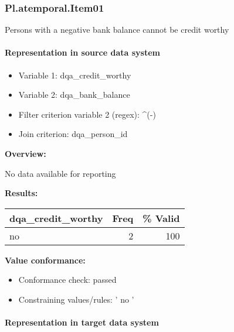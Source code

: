 \documentclass[
]{article}
\providecommand{\tightlist}{%
  \setlength{\itemsep}{0pt}\setlength{\parskip}{0pt}}
\begin{document}
\hypertarget{pl.atemporal.item01}{%
\subsubsection{Pl.atemporal.Item01}\label{pl.atemporal.item01}}

Persons with a negative bank balance cannot be credit worthy

\hypertarget{representation-in-source-data-system-12}{%
\paragraph{Representation in source data
system}\label{representation-in-source-data-system-12}}

\begin{itemize}
\tightlist
\item
  Variable 1: dqa\_credit\_worthy
\item
  Variable 2: dqa\_bank\_balance
\item
  Filter criterion variable 2 (regex): \^{}(-)
\item
  Join criterion: dqa\_person\_id
\end{itemize}

\textbf{Overview:}

No data available for reporting

\textbf{Results:}\\

\begin{table}[H]
\centering
\begin{tabular}{l|r|r}
\hline
\textbf{dqa\_credit\_worthy} & \textbf{Freq} & \textbf{\% Valid}\\
\hline
no & 2 & 100\\
\hline
\end{tabular}
\end{table}

\textbf{Value conformance:}

\begin{itemize}
\tightlist
\item
  Conformance check: passed
\item
  Constraining values/rules: ' no '
\end{itemize}

\hypertarget{representation-in-target-data-system-12}{%
\paragraph{Representation in target data
system}\label{representation-in-target-data-system-12}}
\end{document}
